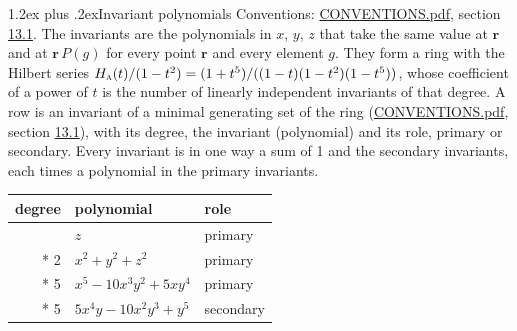 \documentclass[10pt,a4paper]{article}
\makeatletter
\renewcommand\section{\@startsection{section}{1}{\z@}{-3ex plus -1ex minus -.2ex}%
  {1.2ex plus .2ex}{\normalfont\large\sffamily\bfseries\color{parttitle}}}
\numberwithin{equation}{section}
\newcommand{\irr}[1]{\text{\normalfont\scshape #1}}
\newcommand{\pointr}{\mathbf{r}}
\makeatother
\begin{document}
\section{Invariant polynomials}\label{s:invariant_polynomials}
Conventions: \href{../../CONVENTIONS.pdf}{CONVENTIONS.pdf}, section \href{../../CONVENTIONS.pdf\#conv.13.1}{13.1}.
The invariants are the polynomials in $x$, $y$, $z$ that take the same value at $\pointr$ and at $\pointr\,P(g)$ for every point $\pointr$ and every element $g$. They form a ring with the Hilbert series $H_{\irr{a}}(t)/(1-t^{2}) = (1 + t^{5})/((1-t)(1-t^{2})(1-t^{5}))$, whose coefficient of a power of $t$ is the number of linearly independent invariants of that degree. \label{n:head.degree}\label{n:head.role}A row is an invariant of a minimal generating set of the ring (\href{../../CONVENTIONS.pdf}{CONVENTIONS.pdf}, section \href{../../CONVENTIONS.pdf\#conv.13.1}{13.1}), with its degree, the invariant (polynomial) and its role, primary or secondary. Every invariant is in one way a sum of 1 and the secondary invariants, each times a polynomial in the primary invariants.
{\small\begin{longtable}{@{}rll@{}}\toprule
degree & polynomial & role\\\midrule\endhead
\bottomrule\endfoot\endlastfoot
1 & $z$ & primary\\*
2 & $x^{2} + y^{2} + z^{2}$ & primary\\*
5 & $x^{5} - 10x^{3}y^{2} + 5xy^{4}$ & primary\\*
5 & $5x^{4}y - 10x^{2}y^{3} + y^{5}$ & secondary\\
\bottomrule\end{longtable}}
\end{document}

